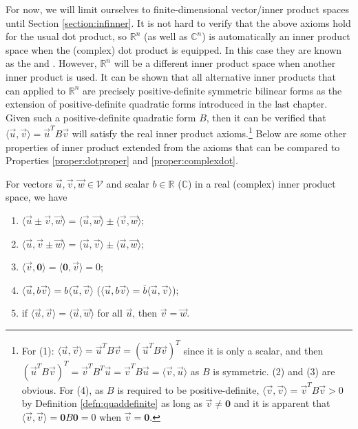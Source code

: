 For now, we will limit ourselves to finite-dimensional vector/inner product spaces until Section \ref{section:infinner}. It is not hard to verify that the above axioms hold for the usual dot product, so $\mathbb{R}^n$ (as well as $\mathbb{C}^n$) is automatically an inner product space when the (complex) dot product is equipped. In this case they are known as the  and . However, $\mathbb{R}^n$ will be a different inner product space when another inner product is used. It can be shown that all alternative inner products that can applied to $\mathbb{R}^n$ are precisely positive-definite symmetric bilinear forms as the extension of positive-definite quadratic forms introduced in the last chapter. Given such a positive-definite quadratic form $B$, then it can be verified that $\langle \vec{u}, \vec{v} \rangle = \vec{u}^TB\vec{v}$ will satisfy the real inner product axioms.\footnote{For (1): $\langle \vec{u}, \vec{v} \rangle = \vec{u}^TB\vec{v} = (\vec{u}^TB\vec{v})^T$ since it is only a scalar, and then $(\vec{u}^TB\vec{v})^T = \vec{v}^TB^T\vec{u} = \vec{v}^TB\vec{u} = \langle \vec{v}, \vec{u} \rangle$ as $B$ is symmetric. (2) and (3) are obvious. For (4), as $B$ is required to be positive-definite, $\langle \vec{v}, \vec{v} \rangle = \vec{v}^TB\vec{v} > 0$ by Definition \ref{defn:quaddefinite} as long as $\vec{v} \neq \textbf{0}$ and it is apparent that $\langle \vec{v}, \vec{v} \rangle = \textbf{0}B\textbf{0} = 0$ when $\vec{v} = \textbf{0}$.} Below are some other properties of inner product extended from the axioms that can be compared to Properties \ref{proper:dotproper} and \ref{proper:complexdot}.
\begin{proper}
\label{proper:innerprod2}
For vectors $\vec{u}, \vec{v}, \vec{w} \in \mathcal{V}$ and scalar $b \in \mathbb{R}$ ($\mathbb{C}$) in a real (complex) inner product space, we have
\begin{enumerate}
    \item $\langle \vec{u} \pm \vec{v}, \vec{w} \rangle = \langle \vec{u}, \vec{w} \rangle \pm \langle \vec{v}, \vec{w} \rangle$;
    \item $\langle \vec{u}, \vec{v} \pm \vec{w} \rangle = \langle \vec{u}, \vec{v} \rangle \pm \langle \vec{u}, \vec{w} \rangle$;
    \item $\langle \vec{v}, \textbf{0} \rangle = \langle \textbf{0}, \vec{v} \rangle = 0$;
    \item $\langle \vec{u}, b\vec{v} \rangle = b\langle \vec{u}, \vec{v} \rangle$ ($\langle \vec{u}, b\vec{v} \rangle = \bar{b}\langle \vec{u}, \vec{v} \rangle$);
    \item if $\langle \vec{u}, \vec{v} \rangle = \langle \vec{u}, \vec{w} \rangle$ for all $\vec{u}$, then $\vec{v} = \vec{w}$.
\end{enumerate}
\end{proper}
